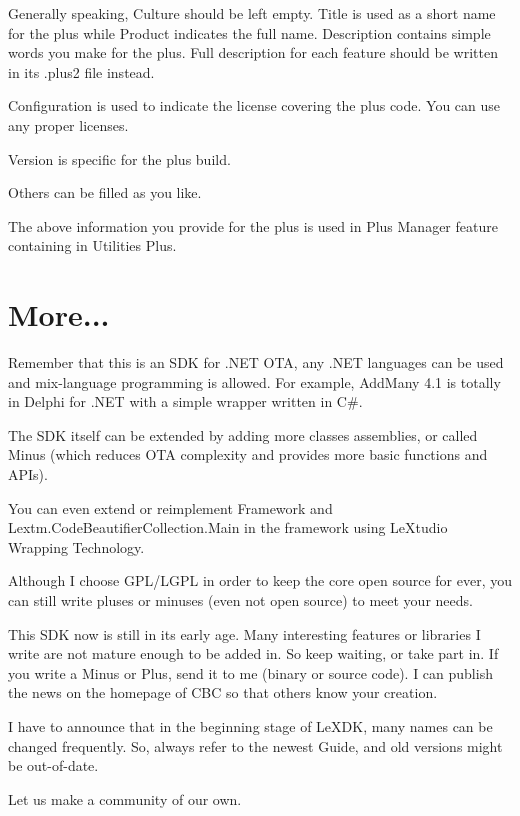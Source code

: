 Generally speaking, Culture should be left empty. Title is used as a short name 
for the plus while Product indicates the full name. Description contains simple 
words you make for the plus. Full description for each feature should be written
in its .plus2 file instead.

Configuration is used to indicate the license covering the plus code. You can 
use any proper licenses. 

Version is specific for the plus build.

Others can be filled as you like.

The above information you provide for the plus is used in Plus Manager feature 
containing in Utilities Plus.

\section{More...}
Remember that this is an SDK for .NET OTA, any .NET languages can be used and 
mix-language programming is allowed. For example, AddMany 4.1 is totally in 
Delphi for .NET with a simple wrapper written in C\#.

The SDK itself can be extended by adding more classes assemblies, or called 
Minus (which reduces OTA complexity and provides more basic functions and APIs).

You can even extend or reimplement Framework and 
Lextm.Code\-Beauti\-fier\-Collection.Main in the framework using LeXtudio 
Wrapping Technology.

Although I choose GPL/LGPL in order to keep the core open source for ever, you
can still write pluses or minuses (even not open source) to meet your needs.

This SDK now is still in its early age. Many interesting features or libraries 
I write are not mature enough to be added in. So keep waiting, or take part in. 
If you write a Minus or Plus, send it to me (binary or source code). I can 
publish the news on the homepage of CBC so that others know your creation.

I have to announce that in the beginning stage of LeXDK, many names can be 
changed frequently. So, always refer to the newest Guide, and old versions
might be out-of-date.

Let us make a community of our own.
